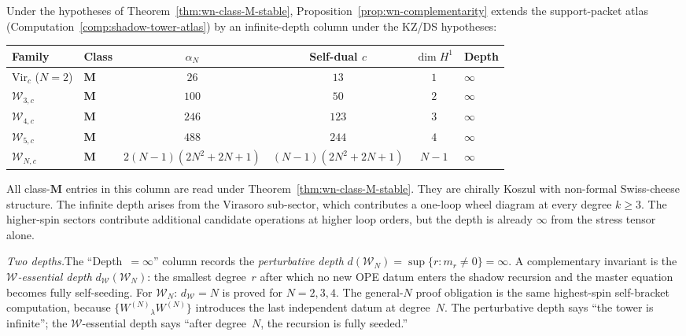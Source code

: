 \begin{remark}
\label{rem:wn-shadow-atlas}
%
Under the hypotheses of Theorem~\ref{thm:wn-class-M-stable},
Proposition~\ref{prop:wn-complementarity}
extends the support-packet atlas
(Computation~\ref{comp:shadow-tower-atlas}) by
an infinite-depth column under the KZ/DS hypotheses:

\begin{center}
\small
\renewcommand{\arraystretch}{1.3}
\begin{tabular}{llcccl}
\toprule
\textbf{Family} & \textbf{Class}
 & $\alpha_N$ & Self-dual $c$ & $\dim H^1$ & \textbf{Depth} \\
\midrule
$\mathrm{Vir}_c$ ($N=2$) & $\mathbf{M}$
 & $26$ & $13$ & $1$ & $\infty$ \\
$\mathcal{W}_{3,c}$ & $\mathbf{M}$
 & $100$ & $50$ & $2$ & $\infty$ \\
$\mathcal{W}_{4,c}$ & $\mathbf{M}$
 & $246$ & $123$ & $3$ & $\infty$ \\
$\mathcal{W}_{5,c}$ & $\mathbf{M}$
 & $488$ & $244$ & $4$ & $\infty$ \\
$\mathcal{W}_{N,c}$ & $\mathbf{M}$
 & $2(N\!-\!1)(2N^2\!+\!2N\!+\!1)$
 & $(N\!-\!1)(2N^2\!+\!2N\!+\!1)$
 & $N\!-\!1$ & $\infty$ \\
\bottomrule
\end{tabular}
\end{center}

\noindent
All class-$\mathbf M$ entries in this column are read under
Theorem~\ref{thm:wn-class-M-stable}. They are chirally Koszul with
non-formal Swiss-cheese structure. The infinite depth arises from the
Virasoro sub-sector, which contributes a one-loop wheel diagram
at every degree $k \ge 3$. The higher-spin sectors contribute
additional candidate operations at higher loop orders,
but the depth is already $\infty$ from the stress tensor alone.

\emph{Two depths.}\enspace The ``Depth~$= \infty$'' column
records the \emph{perturbative depth}
$d(\mathcal{W}_N) = \sup\{r : m_r \ne 0\} = \infty$. A
complementary invariant is the \emph{$\mathcal{W}$-essential
depth} $d_{\mathcal{W}}(\mathcal{W}_N)$: the smallest degree~$r$
after which no new OPE datum enters the shadow recursion and the
master equation becomes fully self-seeding. For
$\mathcal{W}_N$: $d_{\mathcal{W}} = N$ is proved for
$N = 2,3,4$.  The general-$N$ proof obligation is the same
highest-spin self-bracket computation, because
$\{W^{(N)}{}_\lambda W^{(N)}\}$ introduces the last independent
datum at degree~$N$. The perturbative depth says ``the tower is
infinite''; the $\mathcal{W}$-essential depth says ``after
degree~$N$, the recursion is fully seeded.''
\end{remark}

